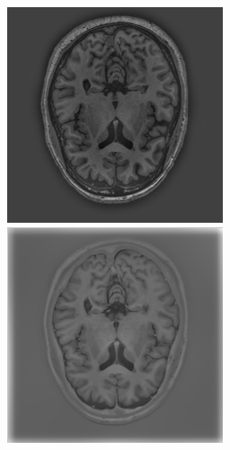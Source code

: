 \documentclass[varwidth=true, border=10pt, convert={size=640x}]{standalone}
\begin{document}
\begin{figure}
   \begin{minipage}{.32\textwidth}
 \includegraphics[width=.99\linewidth]{./images/t1-gs.png}
 \end{minipage}
  \begin{minipage}{.32\textwidth}
 \includegraphics[width=.99\linewidth]{./images/t1-ir-gs.png}

\end{minipage}
\end{figure}
\end{document}
